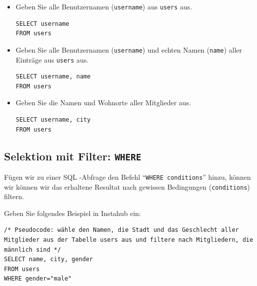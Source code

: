\begin{aufgabe}{}
\begin{itemize}
\item Geben Sie alle Benutzernamen (\texttt{username}) aus \texttt{users} aus.
\begin{myantwort}
\begin{lstlisting}[style=sql]
SELECT username
FROM users
\end{lstlisting}
\end{myantwort}
\item Geben Sie alle Benutzernamen (\texttt{username}) und echten Namen (\texttt{name}) aller Einträge aus \texttt{users} aus.
\begin{myantwort}
\begin{lstlisting}[style=sql]
SELECT username, name
FROM users
\end{lstlisting}
\end{myantwort}
\item Geben Sie die Namen und Wohnorte aller Mitglieder aus.
\begin{myantwort}
\begin{lstlisting}[style=sql]
SELECT username, city
FROM users
\end{lstlisting}
\end{myantwort}
\end{itemize}
\end{aufgabe}


\subsection{Selektion mit Filter: \lstinline[style=sql]|WHERE|}
Fügen wir zu einer \gls{SQL} -Abfrage den Befehl ``\lstinline[style=sql]|WHERE conditions|'' hinzu, können wir können wir das erhaltene Resultat nach gewissen Bedingungen (\texttt{conditions}) filtern. 

\begin{myexample}
Geben Sie folgendes Beispiel in Instahub ein:

\begin{lstlisting}[style=sql]
/* Pseudocode: wähle den Namen, die Stadt und das Geschlecht aller Mitglieder aus der Tabelle users aus und filtere nach Mitgliedern, die männlich sind */
SELECT name, city, gender
FROM users
WHERE gender="male"
\end{lstlisting}
\end{myexample}


